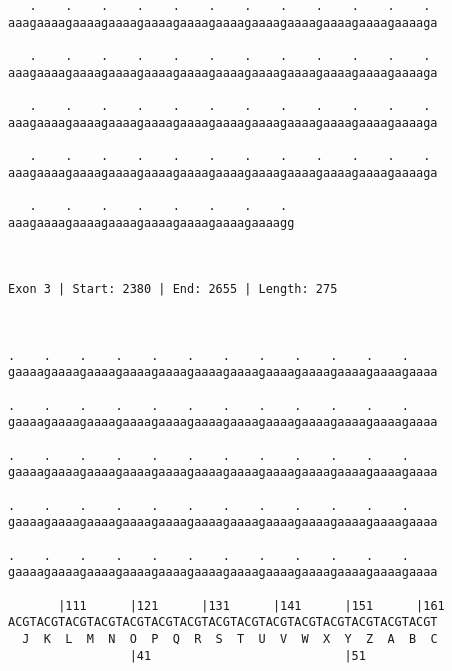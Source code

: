 \documentclass{article}
\begin{document}
\begin{Verbatim}
   .    .    .    .    .    .    .    .    .    .    .    . 
aaagaaaagaaaagaaaagaaaagaaaagaaaagaaaagaaaagaaaagaaaagaaaaga
                                                            
   .    .    .    .    .    .    .    .    .    .    .    . 
aaagaaaagaaaagaaaagaaaagaaaagaaaagaaaagaaaagaaaagaaaagaaaaga
                                                            
   .    .    .    .    .    .    .    .    .    .    .    . 
aaagaaaagaaaagaaaagaaaagaaaagaaaagaaaagaaaagaaaagaaaagaaaaga
                                                            
   .    .    .    .    .    .    .    .    .    .    .    . 
aaagaaaagaaaagaaaagaaaagaaaagaaaagaaaagaaaagaaaagaaaagaaaaga
                                                            
   .    .    .    .    .    .    .    . 
aaagaaaagaaaagaaaagaaaagaaaagaaaagaaaagg
                                        
                                        
 
Exon 3 | Start: 2380 | End: 2655 | Length: 275



.    .    .    .    .    .    .    .    .    .    .    .    
gaaaagaaaagaaaagaaaagaaaagaaaagaaaagaaaagaaaagaaaagaaaagaaaa
                                                            
.    .    .    .    .    .    .    .    .    .    .    .    
gaaaagaaaagaaaagaaaagaaaagaaaagaaaagaaaagaaaagaaaagaaaagaaaa
                                                            
.    .    .    .    .    .    .    .    .    .    .    .    
gaaaagaaaagaaaagaaaagaaaagaaaagaaaagaaaagaaaagaaaagaaaagaaaa
                                                            
.    .    .    .    .    .    .    .    .    .    .    .    
gaaaagaaaagaaaagaaaagaaaagaaaagaaaagaaaagaaaagaaaagaaaagaaaa
                                                            
.    .    .    .    .    .    .    .    .    .    .    .    
gaaaagaaaagaaaagaaaagaaaagaaaagaaaagaaaagaaaagaaaagaaaagaaaa
                                                            
       |111      |121      |131      |141      |151      |161
ACGTACGTACGTACGTACGTACGTACGTACGTACGTACGTACGTACGTACGTACGTACGT
  J  K  L  M  N  O  P  Q  R  S  T  U  V  W  X  Y  Z  A  B  C
                 |41                           |51          
  

\end{Verbatim}
\end{document}
